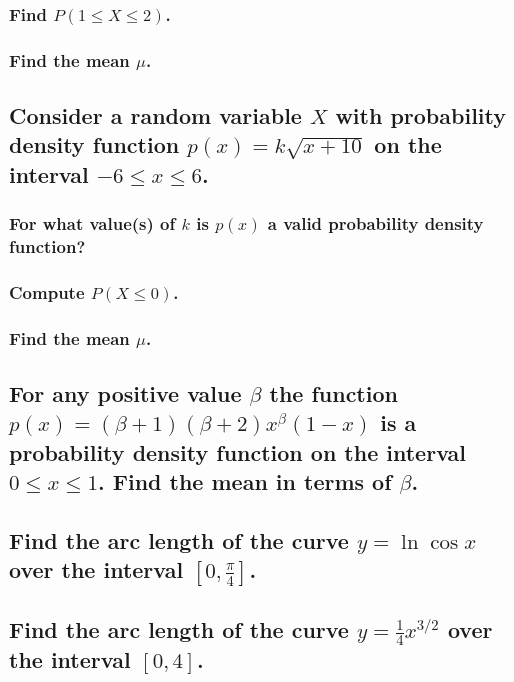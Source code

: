 \documentclass{article}
\begin{document}
\subsubsection{Find $P(1 \leq X \leq 2)$.}

\subsubsection{Find the mean $\mu$.}

\subsection{Consider a random variable $X$ with probability density function $p(x) = k\sqrt{x + 10}$ on the interval $-6 \leq x \leq 6$.}

\subsubsection{For what value(s) of $k$ is $p(x)$ a valid probability density function?}

\subsubsection{Compute $P(X \leq 0)$.}

\subsubsection{Find the mean $\mu$.}

\subsection{For any positive value $\beta$ the function $p(x) = (\beta + 1)(\beta + 2)x^{\beta}(1 - x)$ is a probability density function on the interval $0 \leq x \leq 1$. Find the mean in terms of $\beta$.}

\subsection{Find the arc length of the curve $y = \ln{\cos{x}}$ over the interval $[0, \frac{\pi}{4}]$.}

\subsection{Find the arc length of the curve $y = \frac{1}{4}x^{3/2}$ over the interval $[0, 4]$.}
\end{document}
